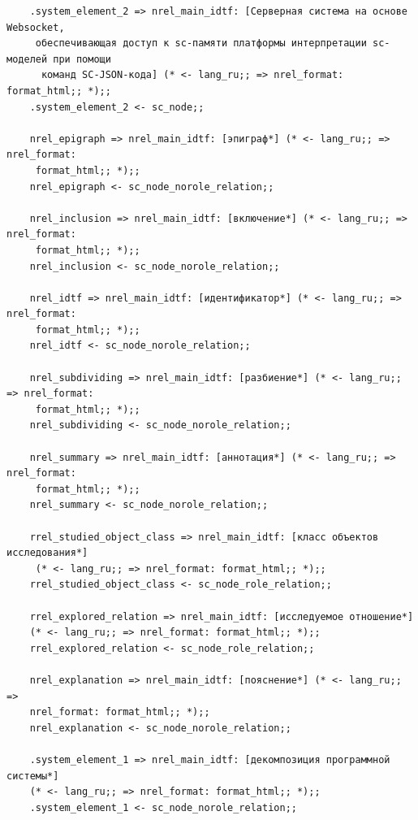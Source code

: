 \begin{verbatim}
	.system_element_2 => nrel_main_idtf: [Серверная система на основе Websocket,
	 обеспечивающая доступ к sc-памяти платформы интерпретации sc-моделей при помощи
	  команд SC-JSON-кода] (* <- lang_ru;; => nrel_format: format_html;; *);;
	.system_element_2 <- sc_node;;
	
	nrel_epigraph => nrel_main_idtf: [эпиграф*] (* <- lang_ru;; => nrel_format:
	 format_html;; *);;
	nrel_epigraph <- sc_node_norole_relation;;
	
	nrel_inclusion => nrel_main_idtf: [включение*] (* <- lang_ru;; => nrel_format:
	 format_html;; *);;
	nrel_inclusion <- sc_node_norole_relation;;
	
	nrel_idtf => nrel_main_idtf: [идентификатор*] (* <- lang_ru;; => nrel_format:
	 format_html;; *);;
	nrel_idtf <- sc_node_norole_relation;;
	
	nrel_subdividing => nrel_main_idtf: [разбиение*] (* <- lang_ru;; => nrel_format:
	 format_html;; *);;
	nrel_subdividing <- sc_node_norole_relation;;
	
	nrel_summary => nrel_main_idtf: [аннотация*] (* <- lang_ru;; => nrel_format:
	 format_html;; *);;
	nrel_summary <- sc_node_norole_relation;;
	
	rrel_studied_object_class => nrel_main_idtf: [класс объектов исследования*]
	 (* <- lang_ru;; => nrel_format: format_html;; *);;
	rrel_studied_object_class <- sc_node_role_relation;;
	
	rrel_explored_relation => nrel_main_idtf: [исследуемое отношение*]
	(* <- lang_ru;; => nrel_format: format_html;; *);;
	rrel_explored_relation <- sc_node_role_relation;;
	
	nrel_explanation => nrel_main_idtf: [пояснение*] (* <- lang_ru;; => 
	nrel_format: format_html;; *);;
	nrel_explanation <- sc_node_norole_relation;;
	
	.system_element_1 => nrel_main_idtf: [декомпозиция программной системы*]
	(* <- lang_ru;; => nrel_format: format_html;; *);;
	.system_element_1 <- sc_node_norole_relation;;
	\end{verbatim}

\label{subsec_latex}
%